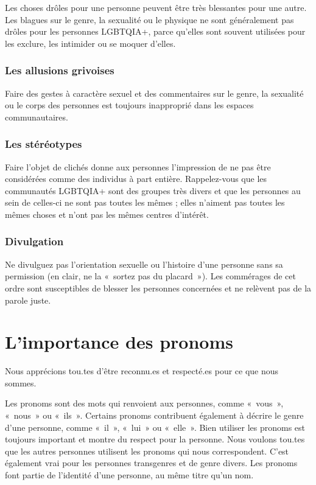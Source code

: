 \documentclass[12pt,openany]{book}
\begin{document}
\noindent Les choses drôles pour une personne peuvent être très blessantes pour une autre. Les blagues sur le genre, la sexualité ou le physique ne sont généralement pas drôles pour les personnes \mbox{LGBTQIA+}, parce qu’elles sont souvent utilisées pour les exclure, les intimider ou se moquer d’elles.

\subsubsection*{Les allusions grivoises}

\noindent Faire des gestes à caractère sexuel et des commentaires sur le genre, la sexualité ou le corps des personnes est toujours inapproprié dans les espaces communautaires.

\subsubsection*{Les stéréotypes}

\noindent Faire l’objet de clichés donne aux personnes l’impression de ne pas être considérées comme des individus à part entière. Rappelez-vous que les communautés \mbox{LGBTQIA+} sont des groupes très divers et que les personnes au sein de celles-ci ne sont pas toutes les mêmes ;
elles n’aiment pas toutes les mêmes choses et n’ont pas les mêmes centres d’intérêt.

\subsubsection*{Divulgation}

\noindent Ne divulguez pas l’orientation sexuelle ou l’histoire d’une personne sans sa permission (en clair, ne la \mbox{« s}ortez pas du placar\mbox{d »}). Les commérages de cet ordre sont susceptibles de blesser les personnes concernées et ne relèvent pas de la parole juste.

\section*{L’importance des pronoms}

\noindent Nous apprécions tou.tes d’être reconnu.es et respecté.es pour ce que nous sommes.

Les pronoms sont des mots qui renvoient aux personnes, comme \mbox{« vous »}, \mbox{« nous »} ou \mbox{« ils »}. Certains pronoms contribuent également à décrire le genre d’une personne, comme \mbox{« il »}, \mbox{« lui »} ou \mbox{« elle »}. Bien utiliser les pronoms est toujours important et montre du respect pour la personne. Nous voulons tou.tes que les autres personnes utilisent les pronoms qui nous correspondent. C’est également vrai pour les personnes transgenres et de genre divers. Les pronoms font partie de l’identité d’une personne, au même titre qu’un nom.
\end{document}
